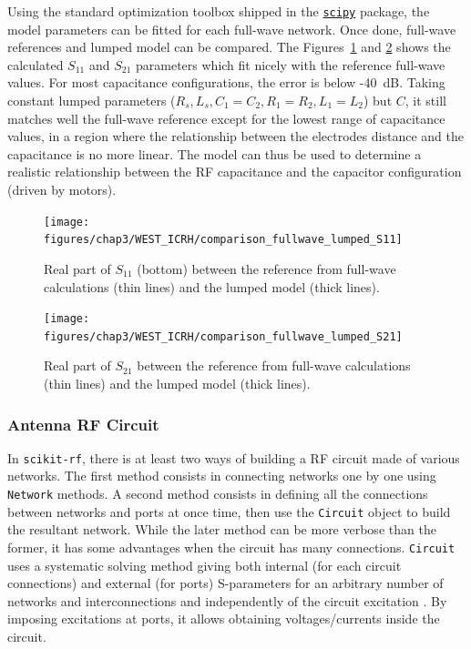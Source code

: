 {Using the standard optimization toolbox shipped in the \href{https://www.scipy.org/}{\texttt{scipy}} package, the model parameters can be fitted for each full-wave network. Once done, full-wave references and lumped model can be compared. The Figures~\ref{fig:capacitor_interpolation_S11} and \ref{fig:capacitor_interpolation_S21} shows the calculated $S_{11}$ and $S_{21}$ parameters which fit nicely with the reference full-wave values. For most capacitance configurations, the error is below -40~dB. Taking constant lumped parameters ($R_s, L_s, C_1=C_2, R_1=R_2, L_1=L_2$) but $C$, it still matches well the full-wave reference except for the lowest range of capacitance values, in a region where the relationship between the electrodes distance and the capacitance is no more linear. The model can thus be used to determine a realistic relationship between the RF capacitance and the capacitor configuration (driven by motors).

\begin{figure}
	\centering
	\texttt{[image: figures/chap3/WEST\_ICRH/comparison\_fullwave\_lumped\_S11]}
	\caption{Real part of $S_{11}$ (bottom) between the reference from full-wave  calculations (thin lines) and the lumped model (thick lines).}
	\label{fig:capacitor_interpolation_S11}
\end{figure}

\begin{figure}
	\centering
	\texttt{[image: figures/chap3/WEST\_ICRH/comparison\_fullwave\_lumped\_S21]}
	\caption{Real part of $S_{21}$ between the reference from full-wave  calculations (thin lines) and the lumped model (thick lines).}
	\label{fig:capacitor_interpolation_S21}
\end{figure}

\clearpage
\subsubsection{Antenna RF Circuit}
In \texttt{scikit-rf}, there is at least two ways of building a RF circuit made of various networks. The first method consists in connecting networks one by one using \texttt{Network} methods. A second method consists in defining all the connections between networks and ports at once time, then use the \texttt{Circuit} object to build the resultant network. While the later method can be more verbose than the former, it has some advantages when the circuit has many connections. \texttt{Circuit} uses a systematic solving method giving both internal (for each circuit connections) and external (for ports) S-parameters for an arbitrary number of networks and interconnections and independently of the circuit excitation . By imposing excitations at ports, it allows obtaining voltages/currents inside the circuit.

}
